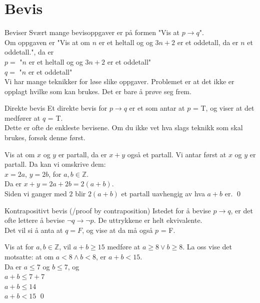 \section{Bevis}

\begin{frame}{Beviser}
    Svært mange bevisoppgaver er på formen "Vis at $p \rightarrow q$".\\
    
    Om oppgaven er "Vis at om $n$ er et heltall og og $3n+2$ er et oddetall, da er $n$ et oddetall.", da er \\
    $p = $ "$n$ er et heltall og og $3n+2$ er et oddetall" \\
    $q = $ "$n$ er et oddetall"\\
    
Vi har mange teknikker for løse slike oppgaver. Problemet er at det ikke er opplagt hvilke som kan brukes. Det er bare å prøve seg frem.
\end{frame}

\begin{frame}{Direkte bevis}
    Et direkte bevis for $p \rightarrow q$ er et som antar at $p$ = T, og viser at det medfører at $q$ = T.\\
    Dette er ofte de enkleste bevisene. Om du ikke vet hva slags teknikk som skal brukes, forsøk denne først.\\
    
    \begin{block}{Vis at om $x$ og $y$ er partall, da er $x + y$ også et partall.}
        Vi antar først at $x$ og $y$ er partall. Da kan vi omskrive dem:\\
        $x = 2a$, $y = 2b$, for $a, b \in \mathbb{Z}$.\\
        Da er $x + y = 2a + 2b = 2(a + b)$.\\
        Siden vi ganger med $2$ blir $2(a + b)$ et partall uavhengig av hva $a + b$ er.
        \qed
    \end{block}
\end{frame}

\begin{frame}{Kontrapositivt bevis (/proof by contraposition)}
    Istedet for å bevise $p \rightarrow q$, er det ofte lettere å bevise $\lnot q \rightarrow \lnot p$. De uttrykkene er helt ekvivalente.\\
    Det vil si å anta at $q = F$, og vise at da må også $p$ = F.\\
    
    \begin{block}{Vis at for $a, b \in \mathbb{Z}$, vil $a + b \geq 15$ medføre at $a \geq 8 \lor b \geq 8$.}
        La oss vise det motsatte: at om $a <8 \land b < 8$, er $a + b < 15$.\\
        Da er $a \leq 7$ og $b \leq 7$, og\\
        $a + b \leq 7 + 7$\\
        $a + b \leq 14$\\
        $a + b < 15$
        \qed
    \end{block}
\end{frame}

